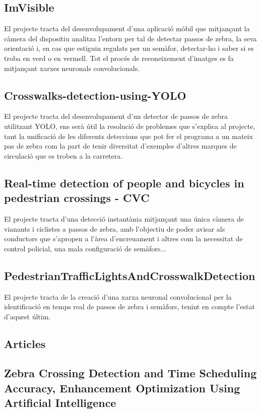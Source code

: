 \documentclass[10pt,a4paper,twocolumn,twoside]{article}
\begin{document}
\subsection*{ImVisible \cite{ImVisible}}
El projecte tracta del desenvolupament d'una aplicació mòbil que mitjançant la càmera del dispositiu analitza l'entorn per tal de detectar passos de zebra, la seva orientació i, en cas que estiguin regulats per un semàfor, detectar-ho i saber si es troba en verd o en vermell. Tot el procés de reconeixement d'imatges es fa mitjançant xarxes neuronals convolucionals.

\subsection*{Crosswalks-detection-using-YOLO \cite{CrosswalksYOLO}}
El projecte tracta del desenvolupament d'un detector de passos de zebra utilitzant YOLO, ens serà útil la resolució de problemes que s'explica al projecte, tant la unificació de les diferents deteccions que pot fer el programa a un mateix pas de zebra com la part de tenir diversitat d'exemples d'altres marques de circulació que es troben a la carretera.

\subsection*{Real-time detection of people and bicycles in pedestrian crossings - CVC \cite{CVCPedestrian}}
El projecte tracta d'una detecció instantània mitjançant una única càmera de vianants i ciclistes a passos de zebra, amb l'objectiu de poder avisar als conductors que s'apropen a l'àrea d'encreuament i altres com la necessitat de control policial, una mala configuració de semàfors...

\subsection*{PedestrianTrafficLightsAndCrosswalkDetection \cite{PedestrianDetection}}
El projecte tracta de la creació d'una xarxa neuronal convolucional per la identificació en temps real de passos de zebra i semàfors, tenint en compte l'estat d'aquest últim.


\subsection{Articles}\label{sec:articles}
\subsection*{Zebra Crossing Detection and Time Scheduling Accuracy, Enhancement Optimization Using Artificial Intelligence \cite{ZebraAI}}
\end{document}
